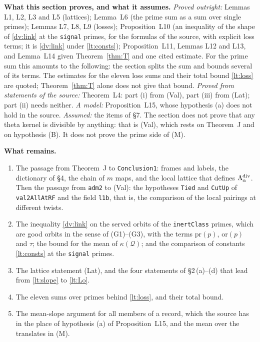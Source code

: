 \documentclass[11pt,letterpaper]{article}
\begin{document}
\textbf{What this section proves, and what it assumes.} \emph{Proved outright:} Lemmas L1, L2, L3 and L5
(lattices); Lemma~L6 (the prime sum as a sum over single primes); Lemmas L7, L8, L9 (losses);
Proposition~L10 (an inequality of the shape of \eqref{dv:link} at the \texttt{signal} primes, for the
formulas of the source, with explicit loss terms; it is \eqref{dv:link} under \eqref{lt:consts});
Proposition~L11, Lemmas L12 and L13, and Lemma~L14 given Theorem~\ref{thm:T} and one cited estimate.
For the prime sum this amounts to the following: the section splits the sum and bounds several of its
terms. The estimates for the eleven loss sums and their total bound \eqref{lt:loss} are quoted;
Theorem~\ref{thm:T} alone does not give that bound.
\emph{Proved from statements of the source:} Theorem~L4: part (i) from \textup{(Val)}, part (iii) from
\textup{(Lat)}; part (ii) needs neither. \emph{A model:} Proposition~L15, whose hypothesis (a) does not
hold in the source. \emph{Assumed:} the items of \S7. The section does not prove that any theta kernel is
divisible by anything: that is \textup{(Val)}, which rests on Theorem~J and on hypothesis (B). It does not
prove the prime side of (M).

\textbf{What remains.}
\begin{enumerate}[label=\textup{(\roman*)},leftmargin=2.4em]
\item The passage from Theorem~J to \texttt{Conclusion1}: frames and labels, the dictionary of \S4, the
chain of $m$ maps, and the local lattice that defines $\Lambda^{\rm div}_\alpha$. Then the passage from
\texttt{adm2} to \textup{(Val)}: the hypotheses \texttt{Tied} and \texttt{CutUp} of \texttt{val2AllAtRF}
and the field \texttt{l1b}, that is, the comparison of the local pairings at different twists.
\item The inequality \eqref{dv:link} on the served orbits of the \texttt{inertClass} primes, which are
good orbits in the sense of (G1)--(G3), with the terms $\mathrm{pr}(p)$, $\mathrm{or}(p)$ and $\tau$; the
bound for the mean of $\kappa(\mathcal Q)$; and the comparison of constants \eqref{lt:consts} at the
\texttt{signal} primes.
\item The lattice statement \textup{(Lat)}, and the four statements of \S2\,(a)--(d) that lead from
\eqref{lt:slope} to \eqref{lt:Lo}.
\item The eleven sums over primes behind \eqref{lt:loss}, and their total bound.
\item The mean-slope argument for all members of a record, which the source has in the place of
hypothesis (a) of Proposition~L15, and the mean over the translates in (M).
\end{enumerate}
\end{document}
